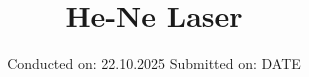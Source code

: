

\subject{v61}
\title{He-Ne Laser}
\date{%
  Conducted on: 22.10.2025
  \hspace{3em}
  Submitted on: DATE
}



\maketitle
\thispagestyle{empty}
\tableofcontents
\newpage
\setcounter{page}{1}







\printbibliography{}


